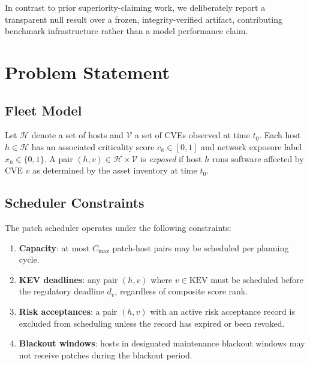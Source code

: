 \documentclass[journal]{IEEEtran}
\begin{document}
In contrast to prior superiority-claiming work, we deliberately
report a transparent null result over a frozen, integrity-verified
artifact, contributing benchmark infrastructure rather than a
model performance claim.

\section{Problem Statement}
\label{sec:problem}

\subsection{Fleet Model}

Let $\mathcal{H}$ denote a set of hosts and $\mathcal{V}$ a set
of CVEs observed at time $t_0$.  Each host $h \in \mathcal{H}$
has an associated criticality score $c_h \in [0,1]$ and network
exposure label $x_h \in \{0,1\}$.  A pair $(h, v) \in
\mathcal{H} \times \mathcal{V}$ is \emph{exposed} if host $h$
runs software affected by CVE $v$ as determined by the
asset inventory at time $t_0$.

\subsection{Scheduler Constraints}

The patch scheduler operates under the following constraints:

\begin{enumerate}

\item \textbf{Capacity}: at most $C_{\text{max}}$ patch-host
  pairs may be scheduled per planning cycle.

\item \textbf{KEV deadlines}: any pair $(h,v)$ where $v \in
  \text{KEV}$ must be scheduled before the regulatory deadline
  $d_v$, regardless of composite score rank.

\item \textbf{Risk acceptances}: a pair $(h,v)$ with an active
  risk acceptance record is excluded from scheduling unless the
  record has expired or been revoked.

\item \textbf{Blackout windows}: hosts in designated maintenance
  blackout windows may not receive patches during the blackout
  period.

\end{enumerate}
\end{document}
